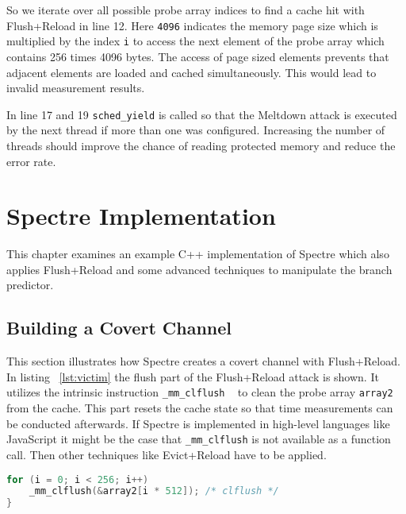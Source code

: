 \documentclass[a4paper,oneside,openright] {scrreprt}
\begin{document}
So we iterate over all possible probe array indices to find a cache hit with Flush+Reload in line 12.
Here \texttt{4096} indicates the memory page size which is multiplied by the index \texttt{i} to access the next element
of the probe array which contains 256 times 4096 bytes. The access of page sized elements prevents that adjacent elements are loaded
and cached simultaneously. This would lead to invalid measurement results.

In line 17 and 19 \texttt{sched\_yield} is called so that the Meltdown attack is executed by the next thread if more
than one was configured. 
Increasing the number of threads should improve the chance of reading protected memory and reduce the error rate.


\section{Spectre Implementation}
\label{ch:intro:motivation}

This chapter examines an example C++ implementation of Spectre which also applies Flush+Reload and some advanced techniques
to manipulate the branch predictor.

\subsection{Building a Covert Channel}
\label{ch:intro:motivation:A}
 
This section illustrates how Spectre creates a covert channel with Flush+Reload. 
In listing ~\ref{lst:victim} the flush part of the Flush+Reload attack is shown. It utilizes the intrinsic instruction 
\texttt{\_mm\_clflush} ~\cite{intelintrinsics} to clean the probe array \texttt{array2} from the cache. This part resets the cache state
so that time measurements can be conducted afterwards. If Spectre is implemented in high-level languages like JavaScript it
might be the case that \texttt{\_mm\_clflush} is not available as a function call. Then other techniques like Evict+Reload have
to be applied.

\begin{lstlisting}[language=C, caption=Spectre: Flush, label={lst:flush}]
for (i = 0; i < 256; i++)
    _mm_clflush(&array2[i * 512]); /* clflush */
}
\end{lstlisting}
\end{document}
